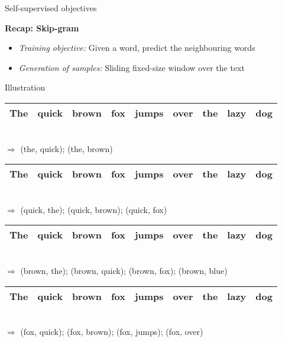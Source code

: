 \begin{vbframe}{Self-supervised objectives}

\vfill

\textbf{Recap: Skip-gram}
	
	\begin{itemize}
		\item \textit{Training objective:} Given a word, predict the neighbouring words
    \item \textit{Generation of samples:} Sliding fixed-size window over the text
	\end{itemize}
	
\begin{block}{Illustration}
\begin{tabular}{|c|c|c|cccccc|}
\hline
\cellcolor{blue!15}The & \cellcolor{blue!65}quick & \cellcolor{blue!65}brown & fox & jumps & over & the & lazy & dog \\
\hline
\end{tabular}\\
$\Rightarrow$ \quad (the, quick); (the, brown)
\begin{tabular}{|c|c|c|c|ccccc|}
\hline
\cellcolor{blue!65}The & \cellcolor{blue!15}quick & \cellcolor{blue!65}brown & \cellcolor{blue!65}fox & jumps & over & the & lazy & dog \\
\hline
\end{tabular}\\
$\Rightarrow$ \quad (quick, the); (quick, brown); (quick, fox)
\begin{tabular}{|c|c|c|c|ccccc|}
\hline
\cellcolor{blue!65}The & \cellcolor{blue!65}quick & \cellcolor{blue!15}brown & \cellcolor{blue!65}fox & \cellcolor{blue!65}jumps & over & the & lazy & dog \\
\hline
\end{tabular}\\
$\Rightarrow$ \quad (brown, the); (brown, quick); (brown, fox); (brown, blue)
\begin{tabular}{|c|c|c|c|ccccc|}
\hline
The & \cellcolor{blue!65}quick & \cellcolor{blue!65}brown & \cellcolor{blue!15}fox & \cellcolor{blue!65}jumps & \cellcolor{blue!65}over & the & lazy & dog \\
\hline
\end{tabular}\\
$\Rightarrow$ \quad (fox, quick); (fox, brown); (fox, jumps); (fox, over)
\end{block}
	
\vfill

\end{vbframe}

